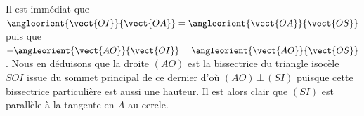 Il est immédiat que
$\angleorient{\vect{OI}}{\vect{OA}}
= \angleorient{\vect{OA}}{\vect{OS}}$
puis que
$- \angleorient{\vect{AO}}{\vect{OI}}
= \angleorient{\vect{AO}}{\vect{OS}}$ .
Nous en déduisons que la droite $(AO)$ est la bissectrice du triangle isocèle $SOI$  issue du sommet principal de ce dernier d'où $(AO) \,\bot\, (SI)$ puisque cette bissectrice particulière est aussi une hauteur. Il est alors clair que $(SI)$ est parallèle à la tangente en $A$ au cercle.
